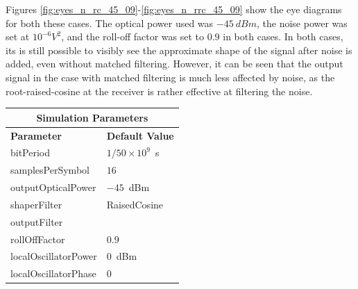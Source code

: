 \begin{refsection}
Figures \ref{fig:eyes_n_rc_45_09}-\ref{fig:eyes_n_rrc_45_09} show the eye
diagrams for both these cases. The optical power used was $-45~dBm$, the
noise power was set at $10^{-6} V^2$, and the roll-off factor was set
to $0.9$ in both cases. In both cases, its is still possible to visibly see the
approximate shape of the signal after noise is added, even without matched
filtering. However, it can be seen that the output signal in the case with
matched filtering is much less affected by noise, as the root-raised-cosine at
the receiver is rather effective at filtering the noise.

\begin{table}[H]
	\centering
	\footnotesize
	\begin{tabular}{|l|l|}
		\hline
		\multicolumn{2}{|c|}{ \textbf{Simulation Parameters} } \\
		\hline
		\textbf{Parameter}     & \textbf{Default Value}                                     \\\hline
		bitPeriod              & $1/50\times10^9$~s														\\\hline
		samplesPerSymbol       & $16$                                                       \\\hline
		outputOpticalPower     & $-45$~dBm 													\\ \hline
		shaperFilter	       & RaisedCosine												\\ \hline
		outputFilter		   & 															\\ \hline
		rollOffFactor		   & 0.9														\\ \hline
		localOscillatorPower   & $0$~dBm                                                    \\ \hline
		localOscillatorPhase   & $0$                                                        \\ \hline

\end{tabular}
\end{table}
\end{refsection}

